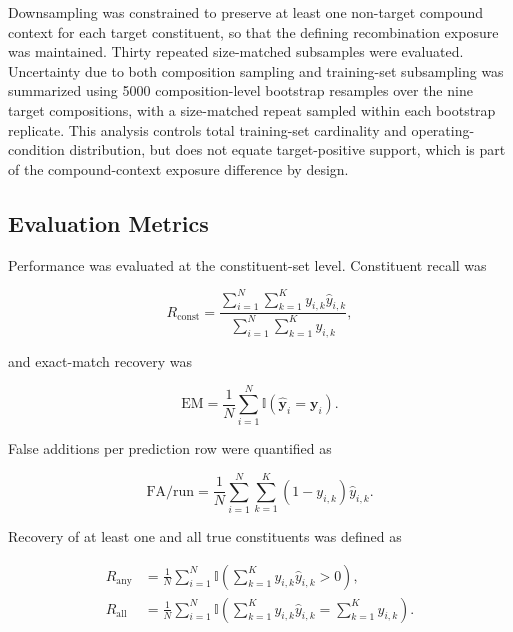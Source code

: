 \documentclass{ieeeaccess}
\begin{document}
Downsampling was constrained to preserve at least one non-target compound
context for each target constituent, so that the defining recombination
exposure was maintained. Thirty repeated size-matched subsamples were
evaluated. Uncertainty due to both composition sampling and training-set
subsampling was summarized using 5000 composition-level bootstrap resamples
over the nine target compositions, with a size-matched repeat sampled within
each bootstrap replicate. This analysis controls total training-set
cardinality and operating-condition distribution, but does not equate
target-positive support, which is part of the compound-context exposure
difference by design.

\subsection{Evaluation Metrics}
\label{subsec:evaluation_metrics}

Performance was evaluated at the constituent-set level. Constituent recall was

\begin{equation}
R_{\mathrm{const}}
=
\frac{
\sum_{i=1}^{N}\sum_{k=1}^{K} y_{i,k}\hat{y}_{i,k}
}{
\sum_{i=1}^{N}\sum_{k=1}^{K} y_{i,k}
},
\label{eq:constituent_recall}
\end{equation}

and exact-match recovery was

\begin{equation}
\mathrm{EM}
=
\frac{1}{N}
\sum_{i=1}^{N}
\mathbb{I}
\left(
\hat{\mathbf{y}}_i=\mathbf{y}_i
\right).
\label{eq:exact_match}
\end{equation}

False additions per prediction row were quantified as

\begin{equation}
\mathrm{FA/run}
=
\frac{1}{N}
\sum_{i=1}^{N}\sum_{k=1}^{K}
(1-y_{i,k})\hat{y}_{i,k}.
\label{eq:false_additions}
\end{equation}

Recovery of at least one and all true constituents was defined as

\begin{align}
R_{\mathrm{any}}
&=
\frac{1}{N}\sum_{i=1}^{N}
\mathbb{I}
\left(
\sum_{k=1}^{K} y_{i,k}\hat{y}_{i,k}>0
\right),
\label{eq:any_recovered}\\
R_{\mathrm{all}}
&=
\frac{1}{N}\sum_{i=1}^{N}
\mathbb{I}
\left(
\sum_{k=1}^{K} y_{i,k}\hat{y}_{i,k}
=
\sum_{k=1}^{K} y_{i,k}
\right).
\label{eq:all_recovered}
\end{align}
\end{document}
